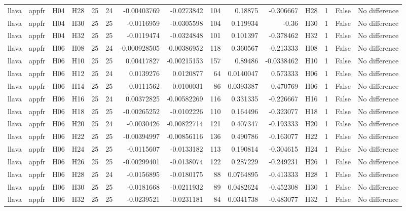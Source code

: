 \begin{longtable}{llllrrrrrrrlrrl}
llava & appfr & H04 & H28 & 25 & 24 & -0.00403769 & -0.0273842 & 104 & 0.18875 & -0.306667 & H28 & 1 & False & No difference \\
llava & appfr & H04 & H30 & 25 & 25 & -0.0116959 & -0.0305598 & 104 & 0.119934 & -0.36 & H30 & 1 & False & No difference \\
llava & appfr & H04 & H32 & 25 & 25 & -0.0119474 & -0.0324848 & 101 & 0.101397 & -0.378462 & H32 & 1 & False & No difference \\
llava & appfr & H06 & H08 & 25 & 24 & -0.000928505 & -0.00386952 & 118 & 0.360567 & -0.213333 & H08 & 1 & False & No difference \\
llava & appfr & H06 & H10 & 25 & 25 & 0.00417827 & -0.00215153 & 157 & 0.89486 & -0.0338462 & H10 & 1 & False & No difference \\
llava & appfr & H06 & H12 & 25 & 24 & 0.0139276 & 0.0120877 & 64 & 0.0140047 & 0.573333 & H06 & 1 & False & No difference \\
llava & appfr & H06 & H14 & 25 & 25 & 0.0111562 & 0.0100031 & 86 & 0.0393387 & 0.470769 & H06 & 1 & False & No difference \\
llava & appfr & H06 & H16 & 25 & 24 & 0.00372825 & -0.00582269 & 116 & 0.331335 & -0.226667 & H16 & 1 & False & No difference \\
llava & appfr & H06 & H18 & 25 & 25 & -0.00265252 & -0.0102226 & 110 & 0.164496 & -0.323077 & H18 & 1 & False & No difference \\
llava & appfr & H06 & H20 & 25 & 24 & -0.0030426 & -0.00822714 & 121 & 0.407347 & -0.193333 & H20 & 1 & False & No difference \\
llava & appfr & H06 & H22 & 25 & 25 & -0.00394997 & -0.00856116 & 136 & 0.490786 & -0.163077 & H22 & 1 & False & No difference \\
llava & appfr & H06 & H24 & 25 & 25 & -0.0115607 & -0.0133182 & 113 & 0.190814 & -0.304615 & H24 & 1 & False & No difference \\
llava & appfr & H06 & H26 & 25 & 25 & -0.00299401 & -0.0138074 & 122 & 0.287229 & -0.249231 & H26 & 1 & False & No difference \\
llava & appfr & H06 & H28 & 25 & 24 & -0.0156895 & -0.0180175 & 88 & 0.0764895 & -0.413333 & H28 & 1 & False & No difference \\
llava & appfr & H06 & H30 & 25 & 25 & -0.0181668 & -0.0211932 & 89 & 0.0482624 & -0.452308 & H30 & 1 & False & No difference \\
llava & appfr & H06 & H32 & 25 & 25 & -0.0239521 & -0.0231181 & 84 & 0.0341738 & -0.483077 & H32 & 1 & False & No difference \\

\end{longtable}
